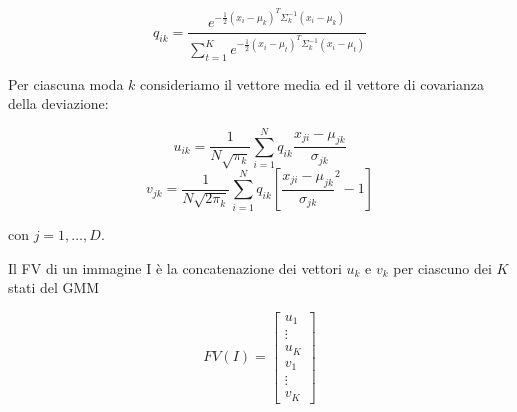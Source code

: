 $$ q_{ik} = \frac{e^{-\frac{1}{2} (x_i - \mu_k)^T \Sigma_{k}^{-1}(x_i - \mu_k)}}{\sum_{t = 1}^{K} e^{-\frac{1}{2} (x_i - \mu_t)^T \Sigma_{k}^{-1}(x_i - \mu_t)}}$$

Per ciascuna moda $k$ consideriamo il vettore media ed il vettore di covarianza della deviazione:

$$u_{ik} = \frac{1}{N\sqrt{\pi_k}} \sum_{i = 1}^{N} q_{ik} \frac{x_{ji} - \mu_{jk}}{\sigma_{jk}}$$
$$v_{jk} = \frac{1}{N\sqrt{2 \pi_k}} \sum_{i = 1}^{N} q_{ik} [\frac{x_{ji} - \mu_{jk}}{\sigma_{jk}}^2 - 1]$$

con $j = 1, \ldots, D$.

Il FV di un immagine I è la concatenazione dei vettori $u_k$ e $v_k$ per ciascuno dei $K$ stati del GMM

$$FV(I) = \left[
     \begin{array}{c}
     u_1 \\ \vdots \\ u_K \\ v_1 \\ \vdots \\ v_K 
     \end{array}
     \right]$$
